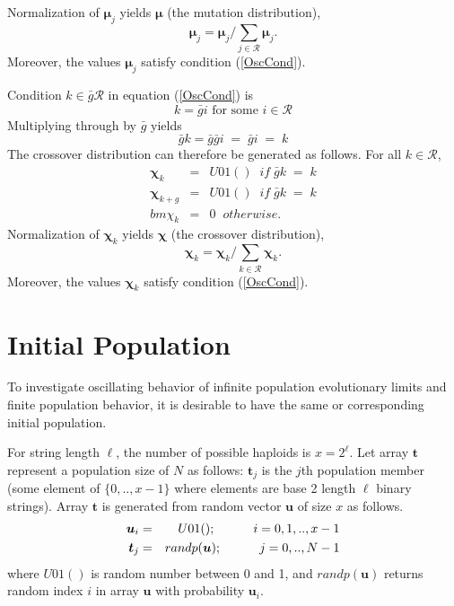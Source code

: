 Normalization of $\bm{\mu}_j$ yields $\bm{\mu}$ (the mutation distribution),
\[
\bm{\mu}_j = \bm{\mu}_j / \sum \limits_{j \in \mathcal{R} } \bm{\mu}_j.
\]
Moreover, the values $\bm{\mu}_j$ satisfy condition (\ref{OscCond}).

Condition $k \in \bar{g} \mathcal{R}$ in equation (\ref{OscCond}) is
\[
k = \bar{g} i  \text{ for some $i \in \mathcal{R}$}
\]
Multiplying through by $\bar{g}$ yields
\begin{equation*}
\bar{g} k = \bar{g} \bar{g} i \; = \; \bar{g} i \; = \; k 
\end{equation*}
The crossover distribution can therefore be generated as follows.
For all $k \in \mathcal{R}$,
\begin{eqnarray*}
\bm{\chi}_k & = & U01() \;\; if\; \bar{g}k \;=\; k \\
\bm{\chi}_{k+g} & = & U01() \;\; if\; \bar{g}k \;=\; k\\
bm{\chi}_k & = & 0  \;\; otherwise.
\end{eqnarray*} 
Normalization of $\bm{\chi}_k$ yields 
$\bm{\chi}$ (the crossover distribution),
\[
\bm{\chi}_k = \bm{\chi}_k/\sum\limits_{k \in \mathcal{R}} \bm{\chi}_k.
\]
Moreover, the values $\bm{\chi}_k$ satisfy condition (\ref{OscCond}).

\section{Initial Population}
\label{InitPopOsc}

To investigate oscillating behavior of infinite population evolutionary limits 
and finite population behavior, it is desirable to have the same or corresponding initial population. 

For string length $\ell$, the number of possible haploids is $x = 2^\ell$. Let array $\bm{t}$ represent a  
population size of $N$ as follows: $\bm{t}_j$ is the $j$th population member (some element of $\{0,..,x-1\}$ 
where elements are base 2 length $\ell$ binary strings). Array $\bm{t}$ is generated from random vector $\bm{u}$ of size $x$ as follows. 
\begin{eqnarray*}
\bm{u}_i & = & U01(); \hspace{30pt} {i = 0, 1,.., x-1} \\
\bm{t}_j & = & randp(\bm{u}) ; \hspace{30pt} {j = 0,.., N-1}
\end{eqnarray*}
where $U01()$ is random number between 0 and 1, and $randp(\bm{u})$ returns random index $i$ in array $\bm{u}$ with probability $\bm{u}_i$.

